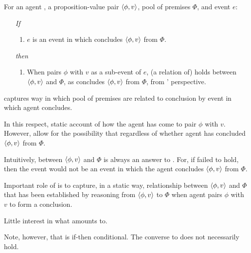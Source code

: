 \begin{note}
  \begin{idea}[\supportI{}]
    \label{idea:support}
    For an agent \vAgent{}, a proposition-value pair \(\langle \phi, v \rangle\), pool of premises \(\Phi\), and event \(e\):

    \begin{itemize}
    \item[\emph{If}]
      \begin{enumerate}[label=\alph*., ref=(\alph*)]
      \item
        \(e\) is an event in which \vAgent{} concludes \(\langle \phi, v \rangle\) from \(\Phi\).
      \end{enumerate}
      \item[\emph{then}]
        \begin{enumerate}[label=\alph*., ref=(\alph*), resume]
        \item
          When \vAgent{} pairs \(\phi\) with \(v\) as a sub-event of \(e\), (a relation of) \emph{\support{}} holds between \(\langle \phi, v \rangle\) and \(\Phi\), as \vAgent{} concludes \(\langle \phi, v \rangle\) from \(\Phi\), from \vAgent{}' perspective.
        \end{enumerate}
      \end{itemize}
      \vspace{-\baselineskip}
  \end{idea}

  \supportI{} captures way in which pool of premises are related to conclusion by event in which agent concludes.

  In this respect, static account of how the agent has come to pair \(\phi\) with \(v\).
  However, allow for the possibility that \support{} regardless of whether agent has concluded \(\langle \phi, v \rangle\) from \(\Phi\).

  Intuitively, \support{} between \(\langle \phi, v \rangle\) and \(\Phi\) is always an answer to \qWhyV{}.
  For, if \support{} failed to hold, then the event would not be an event in which the agent concludes \(\langle \phi, v \rangle\) from \(\Phi\).

  Important role of \supportI{} is to capture, in a static way, relationship between \(\langle \phi, v \rangle\) and \(\Phi\) that has been established by reasoning from \(\langle \phi, v \rangle\) to \(\Phi\) when agent pairs \(\phi\) with \(v\) to form a conclusion.

  Little interest in what \support{} amounts to.
\end{note}

\begin{note}
  Note, however, that \supportI{} is if-then conditional.
  The converse to \supportI{} does not necessarily hold.
\end{note}

